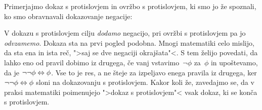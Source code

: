 \begin{boxDisplay}
  \begin{boxedProof}[numbered]
    \begin{boxFrame}
      \begin{boxNested}[2]
      \end{boxNested}
    \end{boxFrame}
  \end{boxedProof}
\end{boxDisplay}

Primerjajmo dokaz s protislovjem in ovržbo s protislovjem, ki smo jo že spoznali, ko smo obravnavali dokazovanje negacije:
%
\begin{boxDisplay}
  \begin{boxedProof}
    \begin{boxFrame}
    \end{boxFrame}
  \end{boxedProof}
  \boxProofSep
  \begin{boxedProof}
    \begin{boxFrame}
    \end{boxFrame}
  \end{boxedProof}
\end{boxDisplay}
%
V dokazu s protislovjem cilju \emph{dodamo} negacijo, pri ovržbi s protislovjem pa jo \emph{odvzamemo}.
%
Dokaza sta na prvi pogled podobna. Mnogi matematiki celo mislijo, da sta ena in ista reč, ">saj se dve negaciji okrajšata"<. S tem želijo povedati, da lahko eno od pravil dobimo iz drugega, če vanj vstavimo~$\neg \phi$ za~$\phi$ in upoštevamo, da je $\neg\neg\phi \Leftrightarrow \phi$. Vse to je res, a ne šteje za izpeljavo enega pravila iz drugega, ker $\neg\neg\phi \Leftrightarrow \phi$ sloni na dokazovanju s protislovjem.
%
Kakor koli že, zavedajmo se, da v praksi matematiki poimenujejo ">dokaz s protislovjem"< vsak dokaz, ki se konča s protislovjem.

